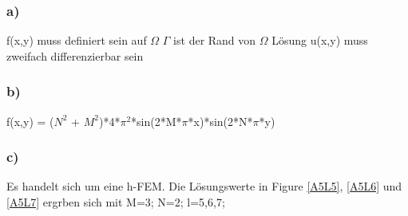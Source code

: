 \documentclass{report}
\begin{document}
	\subsubsection{a)}
	f(x,y) muss definiert sein auf $\Omega$ \newline
	$\Gamma$ ist der Rand von $\Omega$  \newline
	L\"{o}sung u(x,y) muss zweifach differenzierbar sein 
	\subsubsection{b)}
	f(x,y) = ($N^2$ + $M^2$)*4*$\pi^2$*sin(2*M*$\pi$*x)*sin(2*N*$\pi$*y)
	\subsubsection{c)}
	Es handelt sich um eine h-FEM.  \newline
	Die Lösungswerte in Figure \ref{A5L5}, \ref{A5L6} und \ref{A5L7} ergrben sich mit M=3; N=2; l=5,6,7;  \newline
\end{document}

